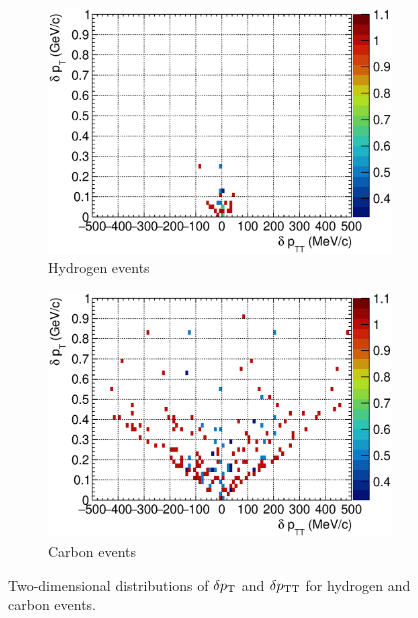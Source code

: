      \begin{figure}
          \begin{subfigure}[b]{\dbfigwid\textwidth}
               \centering
               \includegraphics[width=\textwidth]{figures/perf/tki/SFGpTPCmu_dptt_colnor_vs_dpt_hist2d_al15_H.eps}
               \caption{Hydrogen events}
               \label{subfig:hsel-dpt-dptt-h}
          \end{subfigure}
          \begin{subfigure}[b]{\dbfigwid\textwidth}
               \centering
               \includegraphics[width=\textwidth]{figures/perf/tki/SFGpTPCmu_dptt_colnor_vs_dpt_hist2d_al15_C.eps}
               \caption{Carbon events}
               \label{subfig:hsel-dpt-dptt-c}
          \end{subfigure}
          \caption{Two-dimensional distributions of $\delta p_\textrm{T}$ and $\delta p_\textrm{TT}$ for hydrogen and carbon events.}
          \label{fig:hsel-dpt-dptt}
     \end{figure}

